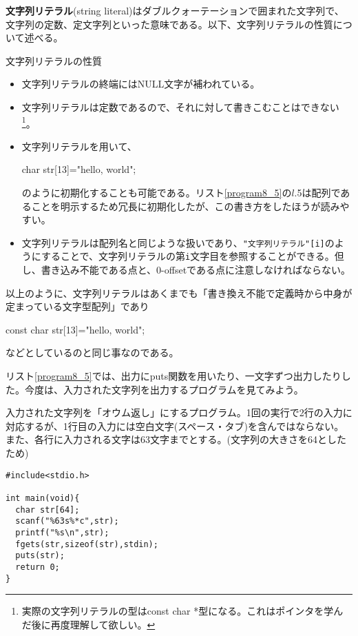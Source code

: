 \textbf{文字列リテラル}(string literal)はダブルクォーテーションで囲まれた文字列で、文字列の定数、定文字列といった意味である。以下、文字列リテラルの性質について述べる。
\begin{itembox}[l]{文字列リテラルの性質}
\begin{itemize}
\item 文字列リテラルの終端にはNULL文字が補われている。
\item 文字列リテラルは定数であるので、それに対して書きこむことはできない\footnote{実際の文字列リテラルの型はconst char *型になる。これはポインタを学んだ後に再度理解して欲しい。}。
\item 文字列リテラルを用いて、
\begin{code}
char str[13]="hello, world";
\end{code}
のように初期化することも可能である。リスト\ref{program8_5}の$l$.5は配列であることを明示するため冗長に初期化したが、この書き方をしたほうが読みやすい。
\item 文字列リテラルは配列名と同じような扱いであり、\verb|"文字列リテラル"[i]|のようにすることで、文字列リテラルの第\verb|i|文字目を参照することができる。但し、書き込み不能である点と、0-offsetである点に注意しなければならない。
\end{itemize}
\end{itembox}

以上のように、文字列リテラルはあくまでも「書き換え不能で定義時から中身が定まっている文字型配列」であり
\begin{code}
const char str[13]="hello, world";
\end{code}
などとしているのと同じ事なのである。

リスト\ref{program8_5}では、出力にputs関数を用いたり、一文字ずつ出力したりした。今度は、入力された文字列を出力するプログラムを見てみよう。
\begin{boxnote}
\begin{multicols}{2}
入力された文字列を「オウム返し」にするプログラム。1回の実行で2行の入力に対応するが、1行目の入力には空白文字(スペース・タブ)を含んではならない。また、各行に入力される文字は63文字までとする。(文字列の大きさを64としたため)
\begin{lstlisting}[caption=文字列の入出力,label=program8_6]
#include<stdio.h>

int main(void){
  char str[64];
  scanf("%63s%*c",str);
  printf("%s\n",str);
  fgets(str,sizeof(str),stdin);
  puts(str);
  return 0;
}
\end{lstlisting}
\end{multicols}
\end{boxnote}

